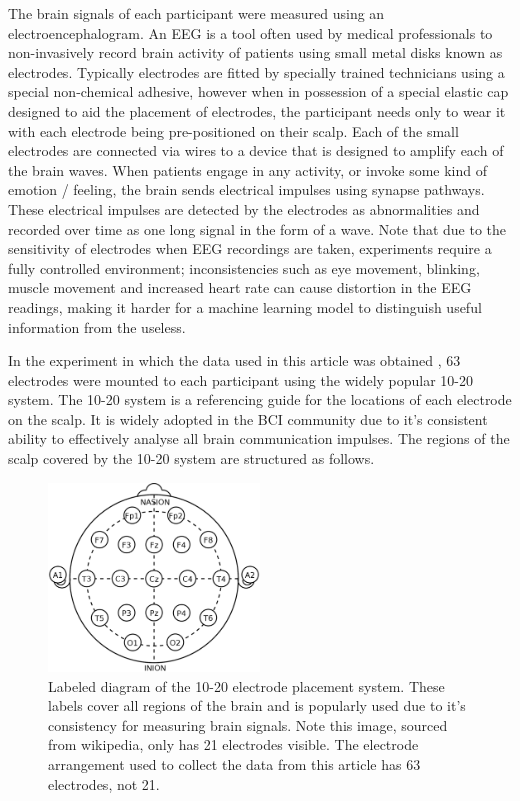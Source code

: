 \documentclass[11pt]{article}
\begin{document}
The brain signals of each participant were measured using an electroencephalogram. An EEG is a tool often used by medical professionals to non-invasively record brain activity of patients using small metal disks known as electrodes. Typically electrodes are fitted by specially trained technicians using a special non-chemical adhesive, however when in possession of a special elastic cap designed to aid the placement of electrodes, the participant needs only to wear it with each electrode being pre-positioned on their scalp. Each of the small electrodes are connected via wires to a device that is designed to amplify each of the brain waves. When patients engage in any activity, or invoke some kind of emotion / feeling, the brain sends electrical impulses using synapse pathways. These electrical impulses are detected by the electrodes as abnormalities and recorded over time as one long signal in the form of a wave. Note that due to the sensitivity of electrodes when EEG recordings are taken, experiments require a fully controlled environment; inconsistencies such as eye movement, blinking, muscle movement and increased heart rate can cause distortion in the EEG readings, making it harder for a machine learning model to distinguish useful information from the useless. 

In the experiment in which the data used in this article was obtained \cite{VALENTINI2022119143}, 63 electrodes were mounted to each participant using the widely popular 10-20 system. The 10-20 system is a referencing guide for the locations of each electrode on the scalp. It is widely adopted in the BCI community due to it's consistent ability to effectively analyse all  brain communication impulses. The regions of the scalp covered by the 10-20 system are structured as follows. 

\begin{figure}[tb]
\centering
\includegraphics[width=0.5\textwidth]{ElectrodePlacementDiagram.png}
\caption{\label{fig:ECD}Labeled diagram of the 10-20 electrode placement system. These labels cover all regions of the brain and is popularly used due to it's consistency for measuring brain signals. Note this image, sourced from wikipedia, only has 21 electrodes visible. The electrode arrangement used to collect the data from this article has 63 electrodes, not 21.}
\end{figure} 
\end{document}
